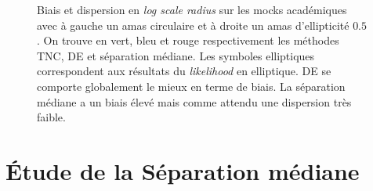 \documentclass[a4paper,11pt]{article}
\numberwithin{equation}{section}
\begin{document}
\begin{figure}
	\caption{Biais et dispersion en \textit{log scale radius} sur les mocks académiques avec à gauche un amas circulaire et à droite un amas d'ellipticité $0.5$. On trouve en vert, bleu et rouge respectivement les méthodes TNC, DE et séparation médiane. Les symboles elliptiques correspondent aux résultats du \textit{likelihood} en elliptique. DE se comporte globalement le mieux en terme de biais. La séparation médiane a un biais élevé mais comme attendu une dispersion très faible.}
	\label{fig:Median}
\end{figure}

  \section{Étude de la Séparation médiane}
\end{document}
